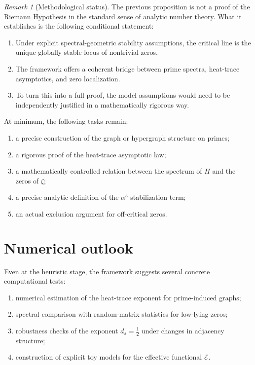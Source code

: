 \documentclass[11pt,a4paper]{amsart}
\theoremstyle{plain}
\theoremstyle{definition}
\theoremstyle{remark}
\newtheorem{remark}[theorem]{Remark}
\newcommand{\zetaR}{\zeta}
\newcommand{\Eeff}{\mathcal{E}}
\begin{document}
	\begin{remark}[Methodological status]
		The previous proposition is not a proof of the Riemann Hypothesis in the standard sense of analytic number theory. What it establishes is the following conditional statement:
		\begin{enumerate}[label=\arabic*.]
			\item Under explicit spectral-geometric stability assumptions, the critical line is the unique globally stable locus of nontrivial zeros.
			\item The framework offers a coherent bridge between prime spectra, heat-trace asymptotics, and zero localization.
			\item To turn this into a full proof, the model assumptions would need to be independently justified in a mathematically rigorous way.
		\end{enumerate}
	\end{remark}
	
	At minimum, the following tasks remain:
	\begin{enumerate}[label=\alph*)]
		\item a precise construction of the graph or hypergraph structure on primes;
		\item a rigorous proof of the heat-trace asymptotic law;
		\item a mathematically controlled relation between the spectrum of $H$ and the zeros of $\zetaR$;
		\item a precise analytic definition of the $\alpha^5$ stabilization term;
		\item an actual exclusion argument for off-critical zeros.
	\end{enumerate}
	
	\section{Numerical outlook}
	
	Even at the heuristic stage, the framework suggests several concrete computational tests:
	\begin{enumerate}[label=\arabic*.]
		\item numerical estimation of the heat-trace exponent for prime-induced graphs;
		\item spectral comparison with random-matrix statistics for low-lying zeros;
		\item robustness checks of the exponent $d_s=\tfrac12$ under changes in adjacency structure;
		\item construction of explicit toy models for the effective functional $\Eeff$.
	\end{enumerate}
	
\end{document}
